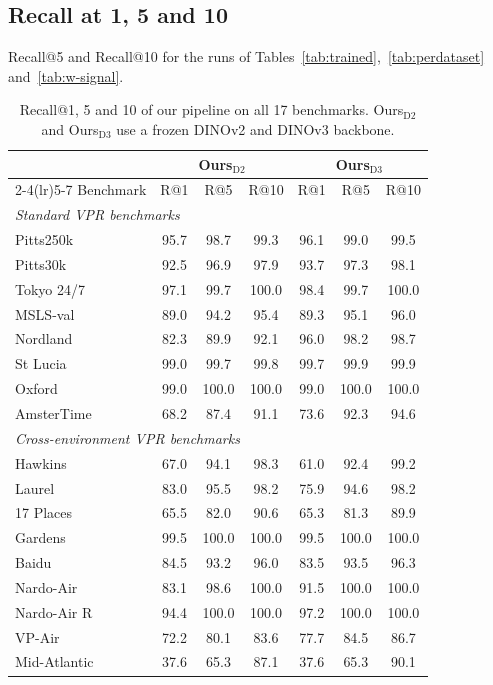 \FloatBarrier

\subsection{Recall at 1, 5 and 10}
\label{app:recallk}
Recall@5 and Recall@10 for the runs of Tables~\ref{tab:trained},~\ref{tab:perdataset} and~\ref{tab:w-signal}.
\begin{table}[H]
\caption{Recall@1, 5 and 10 of our pipeline on all 17 benchmarks. Ours$_{\mathrm{D2}}$ and Ours$_{\mathrm{D3}}$ use a frozen DINOv2 and DINOv3 backbone.}
\label{tab:recallk-ours}
\centering
{\footnotesize\setlength{\tabcolsep}{5pt}
\begin{tabular}{l ccc ccc}
\toprule
& \multicolumn{3}{c}{Ours$_{\mathrm{D2}}$} & \multicolumn{3}{c}{Ours$_{\mathrm{D3}}$} \\
\cmidrule(lr){2-4}\cmidrule(lr){5-7}
Benchmark & R@1 & R@5 & R@10 & R@1 & R@5 & R@10 \\
\midrule
\multicolumn{7}{l}{\emph{Standard VPR benchmarks}} \\
Pitts250k & 95.7 & 98.7 & 99.3 & 96.1 & 99.0 & 99.5 \\
Pitts30k & 92.5 & 96.9 & 97.9 & 93.7 & 97.3 & 98.1 \\
Tokyo 24/7 & 97.1 & 99.7 & 100.0 & 98.4 & 99.7 & 100.0 \\
MSLS-val & 89.0 & 94.2 & 95.4 & 89.3 & 95.1 & 96.0 \\
Nordland & 82.3 & 89.9 & 92.1 & 96.0 & 98.2 & 98.7 \\
St Lucia & 99.0 & 99.7 & 99.8 & 99.7 & 99.9 & 99.9 \\
Oxford & 99.0 & 100.0 & 100.0 & 99.0 & 100.0 & 100.0 \\
AmsterTime & 68.2 & 87.4 & 91.1 & 73.6 & 92.3 & 94.6 \\
\midrule
\multicolumn{7}{l}{\emph{Cross-environment VPR benchmarks}} \\
Hawkins & 67.0 & 94.1 & 98.3 & 61.0 & 92.4 & 99.2 \\
Laurel & 83.0 & 95.5 & 98.2 & 75.9 & 94.6 & 98.2 \\
17 Places & 65.5 & 82.0 & 90.6 & 65.3 & 81.3 & 89.9 \\
Gardens & 99.5 & 100.0 & 100.0 & 99.5 & 100.0 & 100.0 \\
Baidu & 84.5 & 93.2 & 96.0 & 83.5 & 93.5 & 96.3 \\
Nardo-Air & 83.1 & 98.6 & 100.0 & 91.5 & 100.0 & 100.0 \\
Nardo-Air R & 94.4 & 100.0 & 100.0 & 97.2 & 100.0 & 100.0 \\
VP-Air & 72.2 & 80.1 & 83.6 & 77.7 & 84.5 & 86.7 \\
Mid-Atlantic & 37.6 & 65.3 & 87.1 & 37.6 & 65.3 & 90.1 \\
\bottomrule
\end{tabular}}
\end{table}

